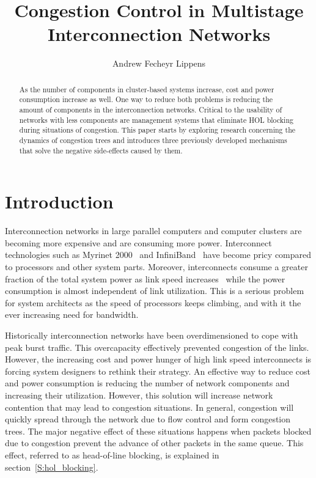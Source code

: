 \documentclass[12pt]{article}
\title{Congestion Control in Multistage Interconnection Networks}
\author{Andrew Fecheyr Lippens}
\date{}
\begin{document}


\begin{abstract}
As the number of components in cluster-based systems increase, cost and power consumption increase as well. One way to reduce both problems is reducing the amount of components in the interconnection networks. Critical to the usability of networks with less components are management systems that eliminate HOL blocking during situations of congestion. This paper starts by exploring research concerning the dynamics of congestion trees and introduces three previously developed mechanisms that solve the negative side-effects caused by them.
\end{abstract}

\setcounter{tocdepth}{2}

\begin{tableofcontents}
\end{tableofcontents}

\newpage

\addtolength{\parskip}{0.5\baselineskip}

\section{Introduction}\label{C:intro}
Interconnection networks in large parallel computers and computer clusters are becoming more expensive and are consuming more power. Interconnect technologies such as Myrinet 2000~\cite{myrinet} and InfiniBand~\cite{infiniband} have become pricy compared to processors and other system parts. Moreover, interconnects consume a greater fraction of the total system power as link speed increases~\cite{SPJ03} while the power consumption is almost independent of link utilization. This is a serious problem for system architects as the speed of processors keeps climbing, and with it the ever increasing need for bandwidth.

Historically interconnection networks have been overdimensioned to cope with peak burst traffic. This overcapacity effectively prevented congestion of the links. However, the increasing cost and power hunger of high link speed interconnects is forcing system designers to rethink their strategy. An effective way to reduce cost and power consumption is reducing the number of network components and increasing their utilization. However, this solution will increase network contention that may lead to congestion situations. In general, congestion will quickly spread through the network due to flow control and form congestion trees. The major negative effect of these situations happens when packets blocked due to congestion prevent the advance of other packets in the same queue. This effect, referred to as head-of-line blocking, is explained in section~\ref{S:hol_blocking}.
\end{document}
